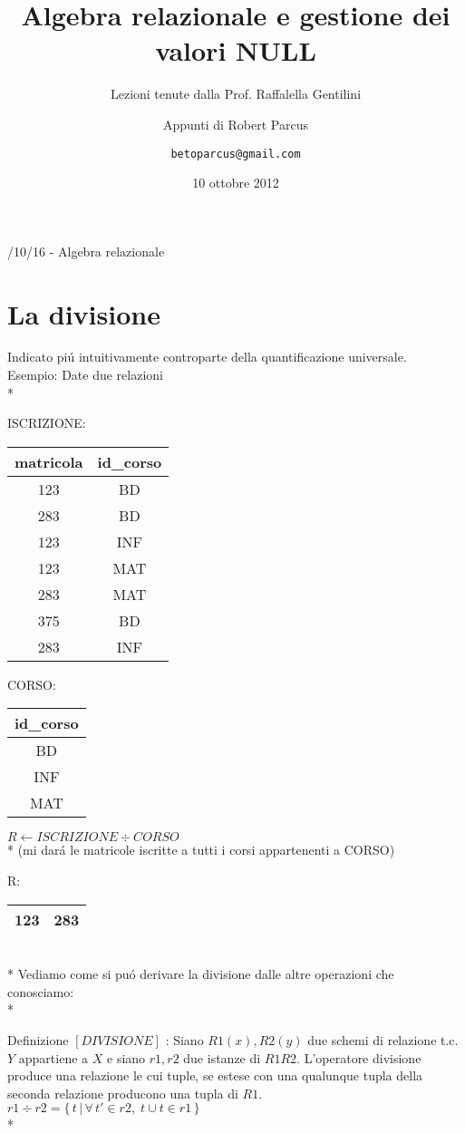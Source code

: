 \documentclass[10pt]{report}
\begin{document}
\title{Algebra relazionale e gestione dei valori NULL}
\author{Lezioni tenute dalla Prof. Raffalella Gentilini
	\and Appunti di Robert Parcus
	\and \texttt{betoparcus@gmail.com}}
\date{10 ottobre 2012}
/10/16 - Algebra relazionale 

\section{La divisione}

Indicato pi\'u intuitivamente controparte della quantificazione universale. \\
Esempio: Date due relazioni \\*

ISCRIZIONE:
\begin{tabular}{|c|c|}
\hline 
matricola & id\_corso \\ 
\hline 
123 & BD \\ 
\hline 
283 & BD \\ 
\hline 
123 & INF \\ 
\hline 
123 & MAT \\ 
\hline 
283 & MAT \\ 
\hline 
375 & BD \\ 
\hline 
283 & INF \\ 
\hline 
\end{tabular} 
CORSO:
\begin{tabular}{|c|}
\hline 
id\_corso \\ 
\hline 
BD \\ 
\hline 
INF \\ 
\hline 
MAT \\ 
\hline 
\end{tabular} 

$R \leftarrow ISCRIZIONE \div CORSO $  \\*
(mi dar\'a   le matricole iscritte a tutti i corsi appartenenti a CORSO)

R: \begin{tabular}{|c|c|}
\hline 
123 & 283 \\
\hline 
\end{tabular} 
\\*
Vediamo come si pu\'o derivare la divisione dalle altre operazioni che conosciamo:\\*

Definizione $[DIVISIONE]$ : Siano $R1(x), R2(y)$ due schemi di relazione t.c. $Y$ appartiene a $X$ e siano
$r1, r2$ due istanze di $R1R2$. L'operatore divisione produce una relazione le cui tuple, se estese con
una qualunque tupla della seconda relazione producono una tupla di $R1$.\\
$r1 \div r2 = \lbrace\, t\, \vert\, \forall \, t' \in r2, \; t \cup t \in r1 \,\rbrace$ \\*
\end{document}
